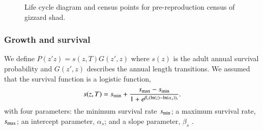 \documentclass[preprint,review,12pt,authoryear]{elsarticle}
\begin{document}
\begin{figure}
\begin{center}
\end{center}
 \caption{\small{Life cycle diagram and census points for pre-reproduction census of gizzard shad.}}
 \label{life_cycle}
\end{figure}

\subsubsection{Growth and survival}
We define $P(z'z) = s(z,T)G(z',z)$ where $s(z)$ is the adult annual survival probability and $G(z',z)$ describes the annual length transitions. 
We assumed that the survival function is a logistic function,
\begin{equation}\label{eq:surv}
s(z,T) = s_{\rm min} + \frac{s_{\rm max}-s_{\rm min}}{1+e^{\beta_s(\ln(z)-\ln(\alpha_s)),}}.
\end{equation}
with four parameters: the minimum survival rate $s_{\rm min}$; a maximum survival rate, $s_{\rm max}$; an intercept parameter, $\alpha_{s}$; and a slope parameter, $\beta_{s}$ \citep{bolker2008ecological}.  
\end{document}
